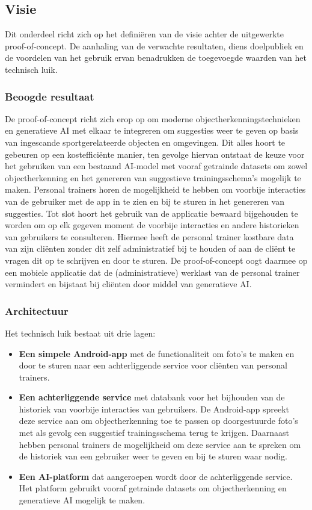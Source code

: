 \subsection{Visie}
\label{subsec:visie}
Dit onderdeel richt zich op het defini\"eren van de visie achter de uitgewerkte proof-of-concept.
De aanhaling van de verwachte resultaten, diens doelpubliek en de voordelen van het gebruik ervan benadrukken de toegevoegde waarden van het technisch luik.

\subsubsection{Beoogde resultaat}
\label{subsubsec:doel-van-de-proof-of-concept}
De proof-of-concept richt zich erop op om moderne objectherkenningstechnieken en generatieve AI met elkaar te integreren om suggesties weer te geven op basis van ingescande sportgerelateerde objecten en omgevingen.
Dit alles hoort te gebeuren op een kosteffici\"ente manier, ten gevolge hiervan ontstaat de keuze voor het gebruiken van een bestaand AI-model met vooraf getrainde datasets om zowel objectherkenning en het genereren van suggestieve trainingsschema's mogelijk te maken.
Personal trainers horen de mogelijkheid te hebben om voorbije interacties van de gebruiker met de app in te zien en bij te sturen in het genereren van suggesties.
Tot slot hoort het gebruik van de applicatie bewaard bijgehouden te worden om op elk gegeven moment de voorbije interacties en andere historieken van gebruikers te consulteren.
Hiermee heeft de personal trainer kostbare data van zijn cliënten zonder dit zelf administratief bij te houden of aan de cliënt te vragen dit op te schrijven en door te sturen.
De proof-of-concept oogt daarmee op een mobiele applicatie dat de (administratieve) werklast van de personal trainer vermindert en bijstaat bij cliënten door middel van generatieve AI\@.

\subsubsection{Architectuur}
\label{subsubsec:architectuur}
Het technisch luik bestaat uit drie lagen:
\begin{itemize}
    \item \textbf{Een simpele Android-app} met de functionaliteit om foto's te maken en door te sturen naar een achterliggende service voor cli\"enten van personal trainers.
    \item \textbf{Een achterliggende service} met databank voor het bijhouden van de historiek van voorbije interacties van gebruikers.
    De Android-app spreekt deze service aan om objectherkenning toe te passen op doorgestuurde foto's met als gevolg een suggestief trainingsschema terug te krijgen.
    Daarnaast hebben personal trainers de mogelijkheid om deze service aan te spreken om de historiek van een gebruiker weer te geven en bij te sturen waar nodig.
    \item \textbf{Een AI-platform} dat aangeroepen wordt door de achterliggende service.
    Het platform gebruikt vooraf getrainde datasets om objectherkenning en generatieve AI mogelijk te maken.
\end{itemize}

